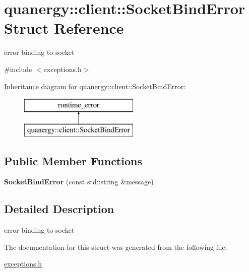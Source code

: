 \hypertarget{structquanergy_1_1client_1_1SocketBindError}{\section{quanergy\-:\-:client\-:\-:Socket\-Bind\-Error Struct Reference}
\label{structquanergy_1_1client_1_1SocketBindError}
}


error binding to socket  




{\ttfamily \#include $<$exceptions.\-h$>$}

Inheritance diagram for quanergy\-:\-:client\-:\-:Socket\-Bind\-Error\-:\begin{figure}[H]
\begin{center}
\leavevmode
\includegraphics[height=2.000000cm]{structquanergy_1_1client_1_1SocketBindError}
\end{center}
\end{figure}
\subsection*{Public Member Functions}
\begin{DoxyCompactItemize}
\item 
\hypertarget{structquanergy_1_1client_1_1SocketBindError_a88d4f5b5c289d05b8fc83fde1a0a2a7d}{{\bfseries Socket\-Bind\-Error} (const std\-::string \&message)}\label{structquanergy_1_1client_1_1SocketBindError_a88d4f5b5c289d05b8fc83fde1a0a2a7d}

\end{DoxyCompactItemize}


\subsection{Detailed Description}
error binding to socket 

The documentation for this struct was generated from the following file\-:\begin{DoxyCompactItemize}
\item 
\hyperlink{exceptions_8h}{exceptions.\-h}\end{DoxyCompactItemize}
